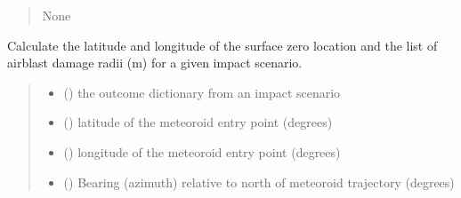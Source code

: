 \documentclass[letterpaper,10pt,english]{sphinxmanual}
\begin{document}
\begin{fulllineitems}
\begin{fulllineitems}
\begin{quote}
\begin{description}
\begin{itemize}
\end{itemize}

\sphinxAtStartPar
None

\end{description}\end{quote}

\end{fulllineitems}


\end{fulllineitems}

\label{\detokenize{index:module-damage}}

\begin{fulllineitems}
\label{\detokenize{index:damage.damage_zones}}
\pysigstartsignatures
{}
\pysigstopsignatures
\sphinxAtStartPar
Calculate the latitude and longitude of the surface zero location and the
list of airblast damage radii (m) for a given impact scenario.
\begin{quote}\begin{description}
\begin{itemize}
\item {} 
\sphinxAtStartPar
{} () \textendash{} the outcome dictionary from an impact scenario

\item {} 
\sphinxAtStartPar
{} () \textendash{} latitude of the meteoroid entry point (degrees)

\item {} 
\sphinxAtStartPar
{} () \textendash{} longitude of the meteoroid entry point (degrees)

\item {} 
\sphinxAtStartPar
{} () \textendash{} Bearing (azimuth) relative to north of meteoroid trajectory (degrees)


\end{itemize}
\end{description}
\end{quote}
\end{fulllineitems}
\end{document}
